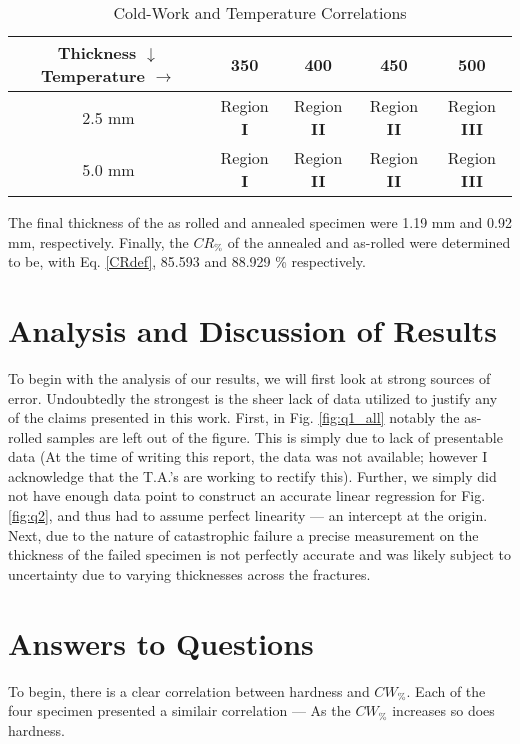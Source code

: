 \documentclass{article}
\begin{document}
\newcommand{\reg}[1]{Region \textbf{#1}}
\begin{table}[]
    \centering
    \def\arraystretch{1.5}
    \caption{Cold-Work and Temperature Correlations}
    \begin{tabular}{|c|c|c|c|c|}
        \toprule
        \hline
         Thickness $\downarrow$ Temperature $\rightarrow$ &  350 & 400 & 450 & 500 \\
         \midrule
         \hline
         2.5 mm & \reg{I} & \reg{II} & \reg{II} & \reg{III}\\
         5.0 mm & \reg{I} & \reg{II} & \reg{II} & \reg{III}\\
         \hline
    \end{tabular}
    \label{tab:q4}
\end{table}

The final thickness of the as rolled and annealed specimen were 1.19 mm and 0.92 mm, respectively. Finally, the $CR_{\%}$ of the annealed and as-rolled were determined to be, with Eq. \ref{CRdef}, 85.593 and 88.929 \% respectively.

\section{Analysis and Discussion of Results}

To begin with the analysis of our results, we will first look at strong sources of error. Undoubtedly the strongest is the sheer lack of data utilized to justify any of the claims presented in this work. First, in Fig. \ref{fig:q1_all} notably the as-rolled samples are left out of the figure. This is simply due to lack of presentable data (At the time of writing this report, the data was not available; however I acknowledge that the T.A.'s are working to rectify this). Further, we simply did not have enough data point to construct an accurate linear regression for Fig. \ref{fig:q2}, and thus had to assume perfect linearity --- an intercept at the origin. Next, due to the nature of catastrophic failure a precise measurement on the thickness of the failed specimen is not perfectly accurate and was likely subject to uncertainty due to varying thicknesses across the fractures. 

\section{Answers to Questions}
To begin, there is a clear correlation between hardness and $CW_{\%}$. Each of the four specimen presented a similair correlation --- As the $CW_{\%}$ increases so does hardness. 
\end{document}
